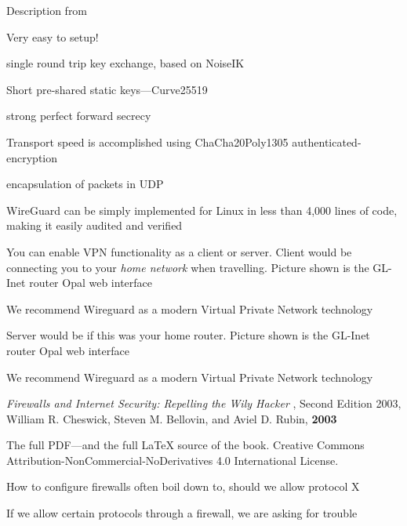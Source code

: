 \documentclass[Screen16to9,17pt]{foils}
\begin{document}
Description from 

\begin{list2}
\item Very easy to setup!
\item single round trip key exchange, based on NoiseIK
\item Short pre-shared static keys—Curve25519
\item strong perfect forward secrecy
\item Transport
speed is accomplished using ChaCha20Poly1305 authenticated-encryption
\item encapsulation of packets in UDP
\item WireGuard can be
simply implemented for Linux in less than 4,000 lines of code, making it easily audited and verified
\end{list2}





You can enable VPN functionality as a client or server. Client would be connecting you to your \emph{home network} when travelling. Picture shown is the GL-Inet router Opal web interface

We recommend Wireguard as a modern Virtual Private Network technology



Server would be if this was your home router.  Picture shown is the GL-Inet router Opal web interface

We recommend Wireguard as a modern Virtual Private Network technology





\breakdance





\begin{list2}
\item \emph{Firewalls and Internet Security: Repelling the Wily Hacker} , Second Edition 2003, William R. Cheswick, Steven M. Bellovin, and Aviel D. Rubin, {\bf 2003} 
\item The full PDF—and the full LaTeX source of the book.
Creative Commons Attribution-NonCommercial-NoDerivatives 4.0 International License.
\item How to configure firewalls often boil down to, should we allow protocol X
\item If we allow certain protocols through a firewall, we are asking for trouble
\end{list2}
\end{document}
